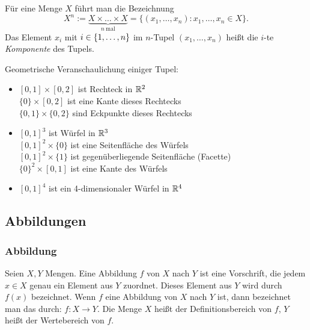 Für eine Menge $ X $ führt man die Bezeichnung
\begin{equation*}
	X^n := \underbrace{X \times \ldots \times X}_{n \:\text{mal}} = \{ (x_1,\ldots,x_n) : x_1,\ldots,x_n \in X \}.
\end{equation*}
Das Element $ x_i $ mit $ i \in \{ 1,\ldots,n \} $ im $ n $-Tupel $ (x_1,\ldots,x_n) $ heißt die $ i $-te \emph{Komponente} des Tupels.

\begin{bsp} Geometrische Veranschaulichung einiger Tupel:
	\begin{itemize}
		\item $ [0,1] \times [0,2] $ ist Rechteck in $ \mathbb R^2 $\\
		$ \{ 0 \} \times [0,2] $ ist eine Kante dieses Rechtecks\\
		$ \{ 0,1 \} \times \{ 0,2 \} $ sind Eckpunkte dieses Rechtecks
		\item $ [0,1]^3 $ ist Würfel in $ \mathbb R^3 $\\
		$ [0,1]^2 \times \{ 0 \} $ ist eine Seitenfläche des Würfels\\
		$ [0,1]^2 \times \{ 1 \} $ ist gegenüberliegende Seitenfläche (Facette)\\
		$ \{ 0 \}^2 \times [0,1] $ ist eine Kante des Würfels
		\item $ [0,1]^4 $ ist ein 4-dimensionaler Würfel in $ \mathbb R^4 $
	\end{itemize}
\end{bsp}


\subsection{Abbildungen}

\subsubsection{Abbildung}

Seien $ X,Y $ Mengen. Eine Abbildung $ f $ von $ X $ nach $ Y $ ist eine Vorschrift, die jedem $ x \in X $ genau ein Element aus $ Y $ zuordnet. Dieses Element aus $ Y $ wird durch $ f(x) $ bezeichnet.
Wenn $ f $ eine Abbildung von $ X $ nach $ Y $ ist, dann bezeichnet man das durch: $ f : X \to Y $. Die Menge $ X $ heißt der Definitionsbereich von $ f $, $ Y $ heißt der Wertebereich von $ f $.

%

